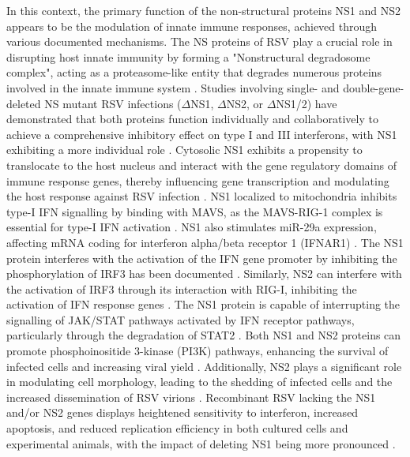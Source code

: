 In this context, the primary function of the non-structural proteins NS1 and NS2 appears to be the modulation of innate immune responses, achieved through various documented mechanisms. The NS proteins of RSV play a crucial role in disrupting host innate immunity by forming a "Nonstructural degradosome complex", acting as a proteasome-like entity that degrades numerous proteins involved in the innate immune system \cite{Boyoglu-Barnum2019BiologyDevelopment.}. Studies involving single- and double-gene-deleted NS mutant RSV infections (\(\Delta\)NS1, \(\Delta\)NS2, or \(\Delta\)NS1/2) have demonstrated that both proteins function individually and collaboratively to achieve a comprehensive inhibitory effect on type I and III interferons, with NS1 exhibiting a more individual role \cite{Sedeyn2019RespiratoryResponses, Spann2004SuppressionMacrophages}. Cytosolic NS1 exhibits a propensity to translocate to the host nucleus and interact with the gene regulatory domains of immune response genes, thereby influencing gene transcription and modulating the host response against RSV infection \cite{Pei2021Nuclear-localizedTranscription}. NS1 localized to mitochondria inhibits type-I IFN signalling by binding with MAVS, as the MAVS-RIG-1 complex is essential for type-I IFN activation \cite{Boyapalle2012RespiratoryInfection}. NS1 also stimulates miR-29a expression, affecting mRNA coding for interferon alpha/beta receptor 1 (IFNAR1) \cite{Sedeyn2019RespiratoryResponses, Zhang2016RespiratoryReceptor}. The NS1 protein interferes with the activation of the IFN gene promoter by inhibiting the phosphorylation of IRF3 has been documented \cite{Spann2005EffectsCytokines}. Similarly, NS2 can interfere with the activation of IRF3 through its interaction with RIG-I, inhibiting the activation of IFN response genes \cite{Wright2006TheHumans}. The NS1 protein is capable of interrupting the signalling of JAK/STAT pathways activated by IFN receptor pathways, particularly through the degradation of STAT2 \cite{Wright2006TheHumans, Sedeyn2019RespiratoryResponses}. Both NS1 and NS2 proteins can promote phosphoinositide 3-kinase (PI3K) pathways, enhancing the survival of infected cells and increasing viral yield \cite{Wu2012TheBiology.}. Additionally, NS2 plays a significant role in modulating cell morphology, leading to the shedding of infected cells and the increased dissemination of RSV virions \cite{Sedeyn2019RespiratoryResponses, Liesman2014RSV-encodedObstruction}. Recombinant RSV lacking the NS1 and/or NS2 genes displays heightened sensitivity to interferon, increased apoptosis, and reduced replication efficiency in both cultured cells and experimental animals, with the impact of deleting NS1 being more pronounced \cite{Whitehead1999RecombinantChimpanzees, Teng2000RecombinantChimpanzees}.

